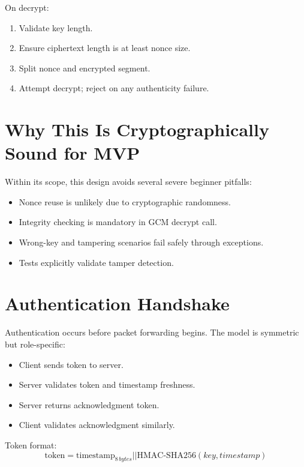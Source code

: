 On decrypt:
\begin{enumerate}[leftmargin=2em]
\item Validate key length.
\item Ensure ciphertext length is at least nonce size.
\item Split nonce and encrypted segment.
\item Attempt decrypt; reject on any authenticity failure.
\end{enumerate}

\section{Why This Is Cryptographically Sound for MVP}
Within its scope, this design avoids several severe beginner pitfalls:
\begin{itemize}[leftmargin=2em]
\item Nonce reuse is unlikely due to cryptographic randomness.
\item Integrity checking is mandatory in GCM decrypt call.
\item Wrong-key and tampering scenarios fail safely through exceptions.
\item Tests explicitly validate tamper detection.
\end{itemize}

\section{Authentication Handshake}
Authentication occurs before packet forwarding begins. The model is symmetric but role-specific:
\begin{itemize}[leftmargin=2em]
\item Client sends token to server.
\item Server validates token and timestamp freshness.
\item Server returns acknowledgment token.
\item Client validates acknowledgment similarly.
\end{itemize}

Token format:
\[
\text{token} = \text{timestamp}_{8\,bytes} || \text{HMAC-SHA256}(key, timestamp)
\]

